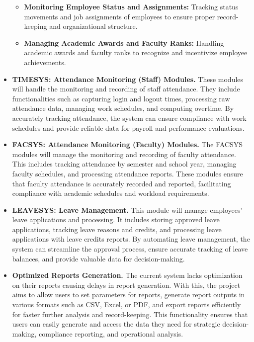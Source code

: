 \begin{itemize}
\begin{itemize}
            \item[] \textbf{Monitoring Employee Status and Assignments:  } Tracking status movements and job assignments of employees to ensure proper record-keeping and organizational structure.
            
            \item[] \textbf{Managing Academic Awards and Faculty Ranks: } Handling academic awards and faculty ranks to recognize and incentivize employee achievements.
        \end{itemize}
       

        \item[] \textbf{TIMESYS: Attendance Monitoring (Staff) Modules.} These modules will handle the monitoring and recording of staff attendance. They include functionalities such as capturing login and logout times, processing raw attendance data, managing work schedules, and computing overtime. By accurately tracking attendance, the system can ensure compliance with work schedules and provide reliable data for payroll and performance evaluations.
        \item[] \textbf{FACSYS: Attendance Monitoring (Faculty) Modules.} The FACSYS modules will manage the monitoring and recording of faculty attendance. This includes tracking attendance by semester and school year, managing faculty schedules, and processing attendance reports. These modules ensure that faculty attendance is accurately recorded and reported, facilitating compliance with academic schedules and workload requirements.
        \item[] \textbf{LEAVESYS: Leave Management.} This module will manage employees' leave applications and processing. It includes storing approved leave applications, tracking leave reasons and credits, and processing leave applications with leave credits reports. By automating leave management, the system can streamline the approval process, ensure accurate tracking of leave balances, and provide valuable data for decision-making.
        \item[] \textbf{Optimized Reports Generation.} The current system lacks optimization on their reports causing delays in report generation. With this, the project aims to allow users to set parameters for reports, generate report outputs in various formats such as CSV, Excel, or PDF, and export reports efficiently for faster further analysis and record-keeping. This functionality ensures that users can easily generate and access the data they need for strategic decision-making, compliance reporting, and operational analysis.
    \end{itemize}
    
